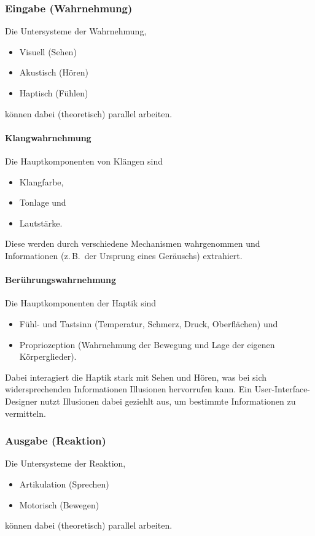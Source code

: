 \documentclass[a4paper, 11pt, accentcolor = tud3b]{tudreport}
\newcommand{\zB}{z.\,B.~}
\begin{document}
				\subsubsection{Eingabe (Wahrnehmung)}
					Die Untersysteme der Wahrnehmung,
					\begin{itemize}
						\item Visuell (Sehen)
						\item Akustisch (Hören)
						\item Haptisch (Fühlen)
					\end{itemize}
					können dabei (theoretisch) parallel arbeiten.
				
					\paragraph{Klangwahrnehmung}
						Die Hauptkomponenten von Klängen sind
						\begin{itemize}
							\item Klangfarbe,
							\item Tonlage und
							\item Lautstärke.
						\end{itemize}
						Diese werden durch verschiedene Mechanismen wahrgenommen und Informationen (\zB der Ursprung eines Geräuschs) extrahiert.

					\paragraph{Berührungswahrnehmung}
						Die Hauptkomponenten der Haptik sind
						\begin{itemize}
							\item Fühl- und Tastsinn (Temperatur, Schmerz, Druck, Oberflächen) und
							\item Propriozeption (Wahrnehmung der Bewegung und Lage der eigenen Körperglieder).
						\end{itemize}
						Dabei interagiert die Haptik stark mit Sehen und Hören, was bei sich widersprechenden Informationen Illusionen hervorrufen kann. Ein User-Interface-Designer nutzt Illusionen dabei geziehlt aus, um bestimmte Informationen zu vermitteln.

				\subsubsection{Ausgabe (Reaktion)}
					Die Untersysteme der Reaktion,
					\begin{itemize}
						\item Artikulation (Sprechen)
						\item Motorisch (Bewegen)
					\end{itemize}
					können dabei (theoretisch) parallel arbeiten.
					
\end{document}
